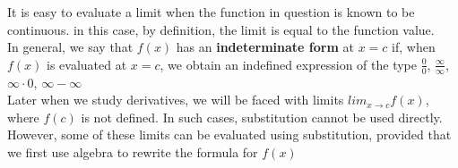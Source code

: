\documentclass{article}
\begin{document}
		It is easy to evaluate a limit when the function in question is known to be continuous. in this case, by definition, the limit is equal to the function value.\\

		In general, we say that $f(x)$ has an \textbf{indeterminate form} at $x = c$ if, when $f(x)$ is evaluated at $x = c$, we obtain an indefined expression of the type $\frac{0}{0}$, $\frac{\infty}{\infty}$, $\infty \cdot 0$, $\infty - \infty$	\\

Later when we study derivatives, we will be faced with limits $lim_{x \to c}f(x)$, where $f(c)$ is not defined. In such cases, substitution cannot be used directly. However, some of these limits can be evaluated using substitution, provided that we first use algebra to rewrite the formula for $f(x)$\\
\end{document}
